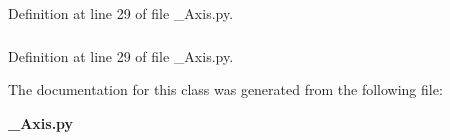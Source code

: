 Definition at line 29 of file \_\-Axis.py.

\subsubsection[{value}]{}\label{classteleop__msgs_1_1msg_1_1__Axis_1_1Axis_a8450ff8eb2486bcf150a0e0512460f1f}


Definition at line 29 of file \_\-Axis.py.



The documentation for this class was generated from the following file:\begin{DoxyCompactItemize}
\item 
{\bf \_\-Axis.py}\end{DoxyCompactItemize}
